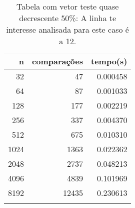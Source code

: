 \begin{table}[ht]
\centering
\begin{tabular}{rrr} \toprule
        n &    comparações &       tempo(s) \\ \midrule
      32  &             47 &      0.000458 \\
      64  &             87 &      0.001033 \\
     128  &            177 &      0.002219 \\
     256  &            337 &      0.004370 \\
     512  &            675 &      0.010310 \\
    1024  &           1363 &      0.022362 \\
    2048  &           2737 &      0.048213 \\
    4096  &           4839 &      0.101969 \\
    8192  &          12435 &      0.230613 \\
\bottomrule\addlinespace
\end{tabular}
\caption{Tabela com vetor teste quase decrescente 50\%: A linha te interesse analisada para este caso é a 12.}
\label{tab:quicksortQuaseDecresc50}
\end{table}
